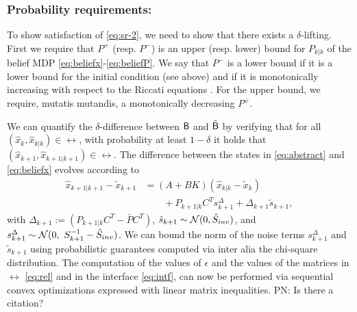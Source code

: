 \documentclass{ifacconf}
\newcommand{\red}[1]{{\color{red} #1}}
\newcommand{\new}[1]{{\color{blue}#1}}
\begin{document}
\subsubsection{Probability requirements:}
To show satisfaction of \eqref{eq:sr-2}, we need to show that there exists a $\delta$-lifting. First we require that $P^+$ (resp. $P^-$) is an upper (resp. lower) bound for $P_{k|k}$ of the belief MDP \eqref{eq:beliefx}-\eqref{eq:beliefP}.  We say that $P^-$ is a lower bound if it is a lower bound for the initial condition (see above) and   if it is monotonically increasing with respect to the Riccati equations \citep{bitmead1985monotonicity}. For the upper bound, we require, mutatis mutandis, a monotonically decreasing $P^+$.

We can quantify the $\delta$-difference between $\mathsf{B}$ and $\tilde {\mathsf{B}}$ by verifying that for all  $(\hat x_k,\hat x_{k|k})\in \rel$, with probability at least $1-\delta$ it holds that $(\hat x_{k+1},\hat x_{k+1|k+1})\in \rel$. The difference between the states in \eqref{eq:abstract} and \eqref{eq:beliefx} evolves according to
\begin{equation}
\begin{aligned}
 \hat x_{k+1|k+1}-  \tilde x_{k+1}&=(A+BK)(\hat x_{k|k}-\tilde x_{k})  \\ & \qquad + P_{k+1|k}C^T s^\Delta_{k+1}+\Delta_{k+1} {\tilde{s}}_{k+1},
\end{aligned}
\end{equation}
with $\Delta_{k+1}:=(P_{k+1|k}C^T-  \bar P C^T)$, $ \tilde{{s}}_{k+1}\sim \mathcal{N} (0,\hat{S}_{inv})$, and $ {s}^\Delta_{k+1}\sim  \mathcal{N} (0,\  S_{k+1}^{-1}-\hat{S}_{inv})$.
We can bound the norm of the noise terms ${s}^\Delta_{k+1}$ and $ \tilde{{s}}_{k+1}$ using probabilistic guarantees computed via inter alia the chi-square distribution. The computation of the values of $\epsilon$ and the values of the matrices  in $\rel$ \eqref{eq:rel} and in the interface \eqref{eq:intf}, can now be performed via sequential convex optimizations expressed with linear matrix inequalities. \new{PN: Is there a citation?}
\end{document}
